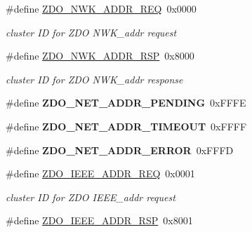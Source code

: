 \begin{DoxyCompactItemize}
\item 
\hypertarget{group__zdo_ga1458b65a34a4f94893f5d0ba12a4f4d8}{\#define \hyperlink{group__zdo_ga1458b65a34a4f94893f5d0ba12a4f4d8}{Z\-D\-O\-\_\-\-N\-W\-K\-\_\-\-A\-D\-D\-R\-\_\-\-R\-E\-Q}~0x0000}\label{group__zdo_ga1458b65a34a4f94893f5d0ba12a4f4d8}

\begin{DoxyCompactList}\small\item\em cluster I\-D for Z\-D\-O N\-W\-K\-\_\-addr request \end{DoxyCompactList}\item 
\hypertarget{group__zdo_ga27214fd0c8264e185af650aaaa937cca}{\#define \hyperlink{group__zdo_ga27214fd0c8264e185af650aaaa937cca}{Z\-D\-O\-\_\-\-N\-W\-K\-\_\-\-A\-D\-D\-R\-\_\-\-R\-S\-P}~0x8000}\label{group__zdo_ga27214fd0c8264e185af650aaaa937cca}

\begin{DoxyCompactList}\small\item\em cluster I\-D for Z\-D\-O N\-W\-K\-\_\-addr response \end{DoxyCompactList}\item 
\hypertarget{group__zdo_gab08dbfd2d3ac3420d6983d57250b5ff6}{\#define {\bfseries Z\-D\-O\-\_\-\-N\-E\-T\-\_\-\-A\-D\-D\-R\-\_\-\-P\-E\-N\-D\-I\-N\-G}~0x\-F\-F\-F\-E}\label{group__zdo_gab08dbfd2d3ac3420d6983d57250b5ff6}

\item 
\hypertarget{group__zdo_ga0fc0eab688d3729212b53bf879c939da}{\#define {\bfseries Z\-D\-O\-\_\-\-N\-E\-T\-\_\-\-A\-D\-D\-R\-\_\-\-T\-I\-M\-E\-O\-U\-T}~0x\-F\-F\-F\-F}\label{group__zdo_ga0fc0eab688d3729212b53bf879c939da}

\item 
\hypertarget{group__zdo_gab6d2ba7c42eb7cc0016b7bec3e5f3439}{\#define {\bfseries Z\-D\-O\-\_\-\-N\-E\-T\-\_\-\-A\-D\-D\-R\-\_\-\-E\-R\-R\-O\-R}~0x\-F\-F\-F\-D}\label{group__zdo_gab6d2ba7c42eb7cc0016b7bec3e5f3439}

\item 
\hypertarget{group__zdo_ga912ec46cfce0729c06fa48e6298cb20f}{\#define \hyperlink{group__zdo_ga912ec46cfce0729c06fa48e6298cb20f}{Z\-D\-O\-\_\-\-I\-E\-E\-E\-\_\-\-A\-D\-D\-R\-\_\-\-R\-E\-Q}~0x0001}\label{group__zdo_ga912ec46cfce0729c06fa48e6298cb20f}

\begin{DoxyCompactList}\small\item\em cluster I\-D for Z\-D\-O I\-E\-E\-E\-\_\-addr request \end{DoxyCompactList}\item 
\hypertarget{group__zdo_ga13eaf1fb0a36978e8c2f9aa7a613238f}{\#define \hyperlink{group__zdo_ga13eaf1fb0a36978e8c2f9aa7a613238f}{Z\-D\-O\-\_\-\-I\-E\-E\-E\-\_\-\-A\-D\-D\-R\-\_\-\-R\-S\-P}~0x8001}\label{group__zdo_ga13eaf1fb0a36978e8c2f9aa7a613238f}


\end{DoxyCompactItemize}
